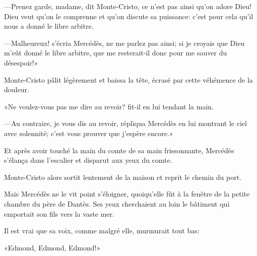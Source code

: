 —Prenez garde, madame, dit Monte-Cristo, ce n'est pas ainsi qu'on adore Dieu! Dieu veut qu'on le comprenne et qu'on discute sa puissance: c'est pour cela qu'il nous a donné le libre arbitre. 

—Malheureux! s'écria Mercédès, ne me parlez pas ainsi; si je croyais que Dieu m'eût donné le libre arbitre, que me resterait-il donc pour me sauver du désespoir!» 

Monte-Cristo pâlit légèrement et baissa la tête, écrasé par cette véhémence de la douleur. 

«Ne voulez-vous pas me dire au revoir? fit-il en lui tendant la main. 

—Au contraire, je vous dis au revoir, répliqua Mercédès en lui montrant le ciel avec solennité; c'est vous prouver que j'espère encore.» 

Et après avoir touché la main du comte de sa main frissonnante, Mercédès s'élança dans l'escalier et disparut aux yeux du comte. 

Monte-Cristo alors sortit lentement de la maison et reprit le chemin du port. 

Mais Mercédès ne le vit point s'éloigner, quoiqu'elle fût à la fenêtre de la petite chambre du père de Dantès. Ses yeux cherchaient au loin le bâtiment qui emportait son fils vers la vaste mer. 

Il est vrai que sa voix, comme malgré elle, murmurait tout bas: 

«Edmond, Edmond, Edmond!» 